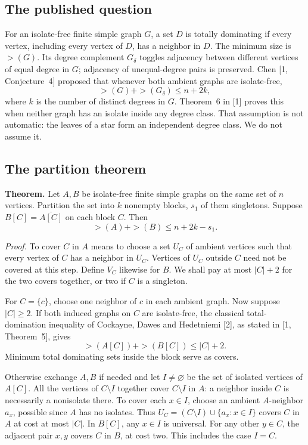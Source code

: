 \documentclass[11pt,a4paper]{article}
\numberwithin{equation}{section}
\theoremstyle{definition}
\theoremstyle{remark}
\begin{document}
\subsection*{The published question}
For an isolate-free finite simple graph $G$, a set $D$ is totally
dominating if every vertex, including every vertex of $D$, has a
neighbor in $D$. The minimum size is $\gt(G)$. Its degree complement
$G_\delta$ toggles adjacency between different vertices of equal
degree in $G$; adjacency of unequal-degree pairs is preserved.
Chen [1, Conjecture~4] proposed that whenever both ambient graphs are
isolate-free,
\[
                 \gt(G)+\gt(G_\delta)\le n+2k,
\]
where $k$ is the number of distinct degrees in $G$. Theorem~6 in [1]
proves this when neither graph has an isolate inside any degree class.
That assumption is not automatic: the leaves of a star form an
independent degree class. We do not assume it.

\subsection*{The partition theorem}
\textbf{Theorem.}
Let $A,B$ be isolate-free finite simple graphs on the same set of $n$
vertices. Partition the set into $k$ nonempty blocks, $s_1$ of them
singletons. Suppose $B[C]=\overline{A[C]}$ on each block $C$.
Then
\[
                    \gt(A)+\gt(B)\le n+2k-s_1 .
\]

\textit{Proof.}
To cover $C$ in $A$ means to choose a set $U_C$ of ambient vertices
such that every vertex of $C$ has a neighbor in $U_C$. Vertices of
$U_C$ outside $C$ need not be covered at this step. Define $V_C$
likewise for $B$. We shall pay at most $|C|+2$ for the two covers
together, or two if $C$ is a singleton.

For $C=\{c\}$, choose one neighbor of $c$ in each ambient graph.
Now suppose $|C|\ge2$. If both induced graphs on $C$ are isolate-free,
the classical total-domination inequality of Cockayne, Dawes and
Hedetniemi [2], as stated in [1, Theorem~5], gives
\[
         \gt(A[C])+\gt(B[C])\le |C|+2 .
\]
Minimum total dominating sets inside the block serve as covers.

Otherwise exchange $A,B$ if needed and let $I\ne\varnothing$ be the
set of isolated vertices of $A[C]$. All the vertices of $C\setminus I$
together cover $C\setminus I$ in $A$: a neighbor inside $C$ is
necessarily a nonisolate there. To cover each $x\in I$, choose an
ambient $A$-neighbor $a_x$, possible since $A$ has no isolates.
Thus $U_C=(C\setminus I)\cup\{a_x:x\in I\}$ covers $C$ in $A$ at cost
at most $|C|$. In $B[C]$, any $x\in I$ is universal. For any other
$y\in C$, the adjacent pair $x,y$ covers $C$ in $B$, at cost two.
This includes the case $I=C$.
\end{document}
